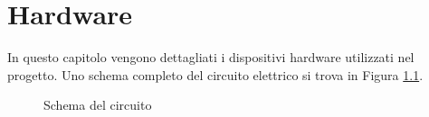 \documentclass[12pt]{report}
\begin{document}
\chapter{Hardware}
\label{cap2}
%

In questo capitolo vengono dettagliati i dispositivi hardware utilizzati nel progetto. Uno schema completo del circuito elettrico si trova in Figura \ref{fig:schematics}.

\begin{figure}
	\caption{Schema del circuito}
	\label{fig:schematics}
\end{figure}
\end{document}
